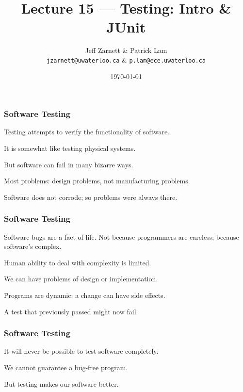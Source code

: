 
\usepackage{alltt}

\title{Lecture 15 --- Testing: Intro \& JUnit}

\author{Jeff Zarnett \& Patrick Lam \\ \small \texttt{jzarnett@uwaterloo.ca} \& \texttt{p.lam@ece.uwaterloo.ca}}
\date{\today}



\begin{frame}
  \titlepage

\end{frame}

\begin{frame}
\frametitle{Software Testing}
\begin{changemargin}{1cm}
\alert{Testing} attempts to verify the functionality of software.

It is somewhat like testing physical systems.

But software can fail in many bizarre ways.

Most problems: design problems, not manufacturing problems.

Software does not corrode; so problems were always there.

\end{changemargin}
\end{frame}


\begin{frame}
\frametitle{Software Testing}
\begin{changemargin}{1cm}
Software bugs are a fact of life. Not because programmers are careless; because software's complex.

Human ability to deal with complexity is limited.

We can have problems of design or implementation.

Programs are dynamic: a change can have side effects.

A test that previously passed might now fail.

\end{changemargin}
\end{frame}

\begin{frame}
\frametitle{Software Testing}
\begin{changemargin}{1cm}
It will never be possible to test software completely.

We cannot guarantee a bug-free program.

But testing makes our software better.

\end{changemargin}
\end{frame}


